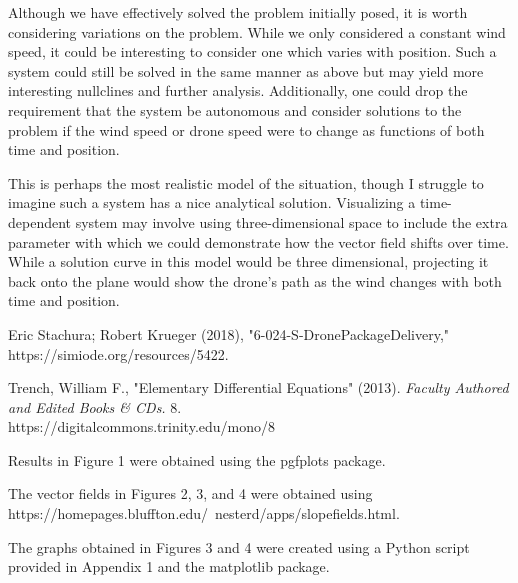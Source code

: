 \documentclass{article}
\begin{document}
    Although we have effectively solved the problem initially posed, it is worth
    considering variations on the problem. While we only considered a constant
    wind speed, it could be interesting to consider one which varies with
    position. Such a system could still be solved in the same manner as above
    but may yield more interesting nullclines and further analysis.
    Additionally, one could drop the requirement that the system be autonomous
    and consider solutions to the problem if the wind speed or drone speed were
    to change as functions of both time and position. 

    This is perhaps the most realistic model of the situation, though I struggle
    to imagine such a system has a nice analytical solution. Visualizing a
    time-dependent system may involve using three-dimensional space to include
    the extra parameter with which we could demonstrate how the vector field
    shifts over time. While a solution curve in this model would be three
    dimensional, projecting it back onto the plane would show the drone's path
    as the wind changes with both time and position.

    \pagebreak

    \begin{thebibliography}{999}
        Eric Stachura; Robert Krueger (2018), "6-024-S-DronePackageDelivery,"
        https://simiode.org/resources/5422.
        
        Trench, William F., "Elementary Differential Equations" (2013).
        \textit{Faculty Authored and Edited Books & CDs.} 8. \\
        https://digitalcommons.trinity.edu/mono/8

        Results in Figure 1 were obtained using the pgfplots package.

        The vector fields in Figures 2, 3, and 4 were obtained using
        https://homepages.bluffton.edu/~nesterd/apps/slopefields.html.

        The graphs obtained in Figures 3 and 4 were created using a Python
        script provided in Appendix 1 and the matplotlib package.
    \end{thebibliography}

    \pagebreak
\end{document}
